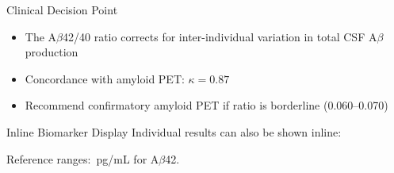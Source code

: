 \documentclass[palette=assay]{rossbeamerbiomarker}
\begin{document}
\begin{frame}{Clinical Decision Point}
  \vskip10pt
  \begin{itemize}
    \item The A$\beta$42/40 ratio corrects for inter-individual variation
          in total CSF A$\beta$ production
    \item Concordance with amyloid PET: $\kappa = 0.87$
    \item Recommend confirmatory amyloid PET if ratio is borderline
          (0.060--0.070)
  \end{itemize}
\end{frame}

\begin{frame}{Inline Biomarker Display}
  Individual results can also be shown inline:\par\vskip8pt
  \par\vskip4pt
  \par\vskip4pt
  \par\vskip4pt
  \par\vskip8pt
  Reference ranges: \,pg/mL for A$\beta$42.
\end{frame}

\end{document}
